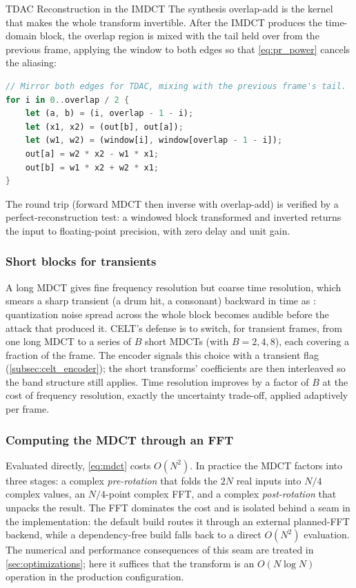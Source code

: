\begin{implementation}{TDAC Reconstruction in the IMDCT}
  The synthesis overlap-add is the kernel that makes the whole transform
  invertible. After the IMDCT produces the time-domain block, the overlap region
  is mixed with the tail held over from the previous frame, applying the window
  to both edges so that \cref{eq:pr_power} cancels the aliasing:
  \begin{lstlisting}[language=Rust]
// Mirror both edges for TDAC, mixing with the previous frame's tail.
for i in 0..overlap / 2 {
    let (a, b) = (i, overlap - 1 - i);
    let (x1, x2) = (out[b], out[a]);
    let (w1, w2) = (window[i], window[overlap - 1 - i]);
    out[a] = w2 * x2 - w1 * x1;
    out[b] = w1 * x2 + w2 * x1;
}
  \end{lstlisting}
  The round trip (forward MDCT then inverse with overlap-add) is verified by a
  perfect-reconstruction test: a windowed block transformed and inverted returns
  the input to floating-point precision, with zero delay and unit gain.
\end{implementation}

\subsubsection{Short blocks for transients}

A long MDCT gives fine frequency resolution but coarse time resolution, which
smears a sharp transient (a drum hit, a consonant) backward in time as
: quantization noise spread across the whole block becomes
audible before the attack that produced it. CELT's defense is to switch, for
transient frames, from one long MDCT to a series of $B$ short MDCTs (with $B =
2, 4, 8$), each covering a fraction of the frame. The encoder signals
this choice
with a transient flag (\cref{subsec:celt_encoder}); the short transforms'
coefficients are then interleaved so the band structure still applies. Time
resolution improves by a factor of $B$ at the cost of frequency resolution,
exactly the uncertainty trade-off, applied adaptively per frame.

\subsubsection{Computing the MDCT through an FFT}

Evaluated directly, \cref{eq:mdct} costs $O(N^2)$. In practice the MDCT
factors into three stages: a complex \emph{pre-rotation} that folds
the $2N$ real
inputs into $N/4$ complex values, an $N/4$-point complex FFT, and a complex
\emph{post-rotation} that unpacks the result. The FFT dominates the cost and is
isolated behind a seam in the implementation: the default build routes it
through an external planned-FFT backend, while a dependency-free
build falls back
to a direct $O(N^2)$ evaluation. The numerical and performance consequences of
this seam are treated in \cref{sec:optimizations}; here it suffices that the
transform is an $O(N\log N)$ operation in the production configuration.


